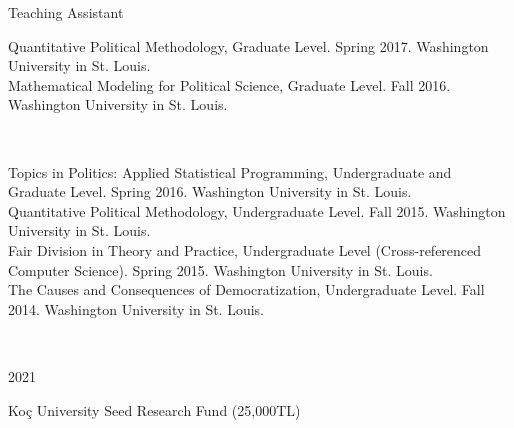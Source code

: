 \documentclass[12pt]{article}
\begin{document}
\begin{minipage}[t]{.3\textwidth}
Teaching Assistant\\
\end{minipage}
\begin{minipage}[t]{.65\textwidth}
\FlushLeft
Quantitative Political Methodology, Graduate Level. Spring 2017. Washington University in St. Louis.\\
\vspace{.35cm}
Mathematical Modeling for Political Science, Graduate Level. Fall 2016. Washington University in St. Louis.\\
\vspace{.35cm}
\end{minipage}
\begin{minipage}[t]{.3\textwidth}
~\\
\end{minipage}
\begin{minipage}[t]{.65\textwidth}
Topics in Politics: Applied Statistical Programming, Undergraduate and Graduate Level. Spring 2016. Washington University in St. Louis.\\
\vspace{.35cm}
Quantitative Political Methodology, Undergraduate Level. Fall 2015. Washington University in St. Louis.\\
\vspace{.35cm}
Fair Division in Theory and Practice, Undergraduate Level (Cross-referenced Computer Science). Spring 2015. Washington University in St. Louis.\\
\vspace{.35cm}
The Causes and Consequences of Democratization, Undergraduate Level. Fall 2014. Washington University in St. Louis.\\
\end{minipage}


\vspace{.5cm}

\\
\vspace{.2cm}

\begin{minipage}[t]{.15\textwidth}
2021\\
\end{minipage}
\begin{minipage}[t]{.8\textwidth}
\FlushLeft
Ko\c{c} University Seed Research Fund (25,000TL)\\
\end{minipage}
\vspace{.5cm}
\end{document}
